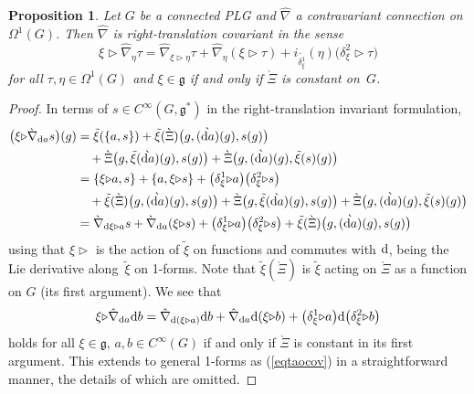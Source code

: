\documentclass[10pt,a4paper]{amsart}
\numberwithin{equation}{section}
\newtheorem{Proposition}[Theorem]{Proposition}
 { \theoremstyle{definition}
\newtheorem{Definition}[Theorem]{Definition}
\newtheorem{Example}[Theorem]{Example}
\newtheorem{Remark}[Theorem]{Remark} }
\newcommand{\<}{{\langle}}
\renewcommand{\>}{{\rangle}}
\newcommand{\extd}{{\rm d}}
\newcommand{\la}{{\triangleright}}
\newcommand{\cg}{{\mathfrak{g}}}
\newcommand{\tilder}{\grave}
\begin{document}
\begin{Proposition}\label{taocovarianceprop} Let $G$ be a connected PLG and $\hat\nabla$ a contravariant connection on $\Omega^1(G)$. Then $\hat\nabla$ is right-translation covariant in the sense
\begin{equation}\label{eqtaocov}\xi\la\hat\nabla_{\eta}\tau=\hat\nabla_{\xi\la\eta}\tau+\hat\nabla_{\eta}(\xi\la\tau) +i_{\tilde{\delta_\xi^1}}(\eta)\big(\delta_\xi^2\la\tau\big)
\end{equation}
for all $\tau,\eta\in\Omega^1(G)$ and $\xi\in\cg$ if and only if $\tilder\Xi$ is constant on~$G$.
\end{Proposition}
\begin{proof} In terms of $s\in C^\infty(G,\cg^*)$ in the right-translation invariant formulation,
\begin{align*} \big(\xi\la\tilder\nabla_{\extd a}s\big)(g)&=\tilde\xi(\{a,s\})+\tilde\xi(\tilder\Xi)\big(g,\tilder{(\extd a)}(g),s(g)\big)\\
&\quad {}+\tilder\Xi\big(g,\tilde\xi(\tilder{\extd a})(g),s(g)\big)+\tilder\Xi\big(g,\tilder{(\extd a)}(g),\tilde\xi(s)(g)\big)\\
&=\{\xi\la a,s\}+\{a,\xi\la s\}+\big(\delta^1_\xi\la a\big)\big(\delta^2_\xi\la s\big)\\
&\quad{}+\tilde\xi(\tilder\Xi)\big(g,\tilder{(\extd a)}(g),s(g)\big)+\tilder\Xi\big(g,\tilde\xi(\tilder{\extd a})(g),s(g)\big)+\tilder\Xi\big(g,\tilder{(\extd a)}(g),\tilde\xi(s)(g)\big)\\
&=\tilder\nabla_{\extd \xi\la a}s+\tilder\nabla_{\extd a}(\xi\la s)+\big(\delta^1_\xi\la a\big)\big(\delta^2_\xi\la s\big) +\tilde\xi(\tilder\Xi)\big(g,\tilder{(\extd a)}(g),s(g)\big)\end{align*}
using that $\xi\la$ is the action of $\tilde\xi$ on functions and commutes with $\extd$, being the Lie derivative along~$\tilde\xi$ on 1-forms. Note that $\tilde\xi(\tilder\Xi)$ is $\tilde\xi$ acting on $\tilder\Xi$ as a function on $G$ (its first argument). We see that
\begin{equation}\label{covcon}
\xi\la\hat\nabla_{\extd a}\extd b=\hat\nabla_{\extd(\xi\la a)}\extd b+\hat\nabla_{\extd a}\extd(\xi\la b)+\big(\delta_\xi^1\la a\big)\extd\big(\delta_\xi^2\la b\big)
\end{equation}
holds for all $\xi\in\cg$, $a,b\in C^\infty(G)$ if and only if $\tilder\Xi$ is constant in its first argument. This extends to general 1-forms as (\ref{eqtaocov}) in a straightforward manner, the details of which are omitted. \end{proof}
\end{document}
